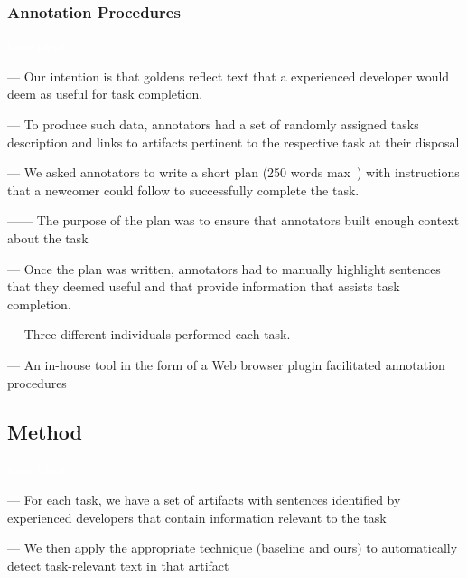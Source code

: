 \subsubsection{Annotation Procedures}
\textcolor{white}{force ident} %

--- Our intention is that goldens reflect text that a experienced developer would deem as useful for task completion. \vspace{3mm}

--- To produce such data, annotators had a set of randomly assigned tasks description and links to artifacts 
pertinent to the respective task at their disposal \vspace{3mm}

--- We asked annotators to write a short plan (250 words max~\cite{Rastkar2010}) with instructions that a newcomer could follow to successfully complete the task. 

------ The purpose of the plan was to ensure that annotators built enough context about the task \vspace{3mm}

--- Once the plan was written,  annotators had to manually highlight sentences that they deemed useful and that provide information that assists task completion. \vspace{3mm}

--- Three different individuals performed each task. \vspace{3mm}

--- An in-house tool in the form of a Web browser plugin facilitated annotation procedures



\subsection{Method}
\textcolor{white}{force ident} %


--- For each task, we have a set of artifacts with sentences identified by experienced developers that contain information relevant to the task \vspace{3mm}

--- We then apply the appropriate technique (baseline and ours) to automatically detect task-relevant text in that artifact


